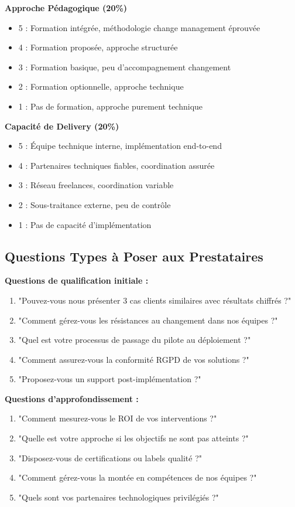 \textbf{Approche Pédagogique (20\%)}
\begin{itemize}
    \item 5 : Formation intégrée, méthodologie change management éprouvée
    \item 4 : Formation proposée, approche structurée
    \item 3 : Formation basique, peu d'accompagnement changement
    \item 2 : Formation optionnelle, approche technique
    \item 1 : Pas de formation, approche purement technique
\end{itemize}

\textbf{Capacité de Delivery (20\%)}
\begin{itemize}
    \item 5 : Équipe technique interne, implémentation end-to-end
    \item 4 : Partenaires techniques fiables, coordination assurée
    \item 3 : Réseau freelances, coordination variable
    \item 2 : Sous-traitance externe, peu de contrôle
    \item 1 : Pas de capacité d'implémentation
\end{itemize}

\subsection{Questions Types à Poser aux Prestataires}

\textbf{Questions de qualification initiale :}
\begin{enumerate}
    \item "Pouvez-vous nous présenter 3 cas clients similaires avec résultats chiffrés ?"
    \item "Comment gérez-vous les résistances au changement dans nos équipes ?"
    \item "Quel est votre processus de passage du pilote au déploiement ?"
    \item "Comment assurez-vous la conformité RGPD de vos solutions ?"
    \item "Proposez-vous un support post-implémentation ?"
\end{enumerate}

\textbf{Questions d'approfondissement :}
\begin{enumerate}
    \item "Comment mesurez-vous le ROI de vos interventions ?"
    \item "Quelle est votre approche si les objectifs ne sont pas atteints ?"
    \item "Disposez-vous de certifications ou labels qualité ?"
    \item "Comment gérez-vous la montée en compétences de nos équipes ?"
    \item "Quels sont vos partenaires technologiques privilégiés ?"
\end{enumerate}

